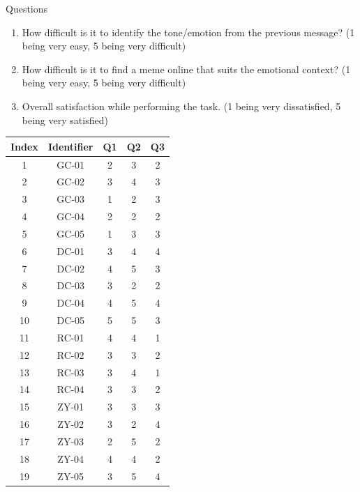 \documentclass[acmsmall,screen,authorversion,nonacm]{acmart}
\begin{document}
Questions
\begin{enumerate}
    \item How difficult is it to identify the tone/emotion from the previous message? (1 being very easy, 5 being very difficult)
    \item How difficult is it to find a meme online that suits the emotional context? (1 being very easy, 5 being very difficult)
    \item Overall satisfaction while performing the task. (1 being very dissatisfied, 5 being very satisfied)
\end{enumerate}

\begin{center}
    \begin{table}[H]
    \begin{tabular}{|c|c|c|c|c|}
    \hline
    Index & Identifier & Q1 & Q2 & Q3 \\ \hline
    1     & GC-01      & 2  & 3  & 2  \\ \hline
    2     & GC-02      & 3  & 4  & 3  \\ \hline
    3     & GC-03      & 1  & 2  & 3  \\ \hline
    4     & GC-04      & 2  & 2  & 2  \\ \hline
    5     & GC-05      & 1  & 3  & 3  \\ \hline
    6     & DC-01      & 3  & 4  & 4  \\ \hline
    7     & DC-02      & 4  & 5  & 3  \\ \hline
    8     & DC-03      & 3  & 2  & 2  \\ \hline
    9     & DC-04      & 4  & 5  & 4  \\ \hline
    10    & DC-05      & 5  & 5  & 3  \\ \hline
    11    & RC-01      & 4  & 4  & 1  \\ \hline
    12    & RC-02      & 3  & 3  & 2  \\ \hline
    13    & RC-03      & 3  & 4  & 1  \\ \hline
    14    & RC-04      & 3  & 3  & 2  \\ \hline
    15    & ZY-01      & 3  & 3  & 3  \\ \hline
    16    & ZY-02      & 3  & 2  & 4  \\ \hline
    17    & ZY-03      & 2  & 5  & 2  \\ \hline
    18    & ZY-04      & 4  & 4  & 2  \\ \hline
    19    & ZY-05      & 3  & 5  & 4  \\ \hline

\end{tabular}
\end{table}
\end{center}
\end{document}
